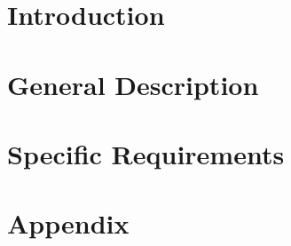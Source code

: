 \maketitle
\clearpage
\tableofcontents

\clearpage
\section{Introduction} \label{Intro}


\clearpage
\section{General Description} \label{Description}


\clearpage
\section{Specific Requirements} \label {Requirements}




\clearpage
\section{Appendix}
